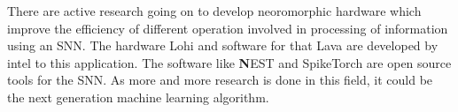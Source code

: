 There are active research going on to develop neoromorphic hardware which
improve the efficiency of different operation involved in processing of
information using an SNN. The hardware Lohi and software for that Lava are
developed by intel to this application. The software like \textbf NEST and
SpikeTorch are open source tools for the SNN. As more and more research is done
in this field, it could be the next generation machine learning algorithm.

